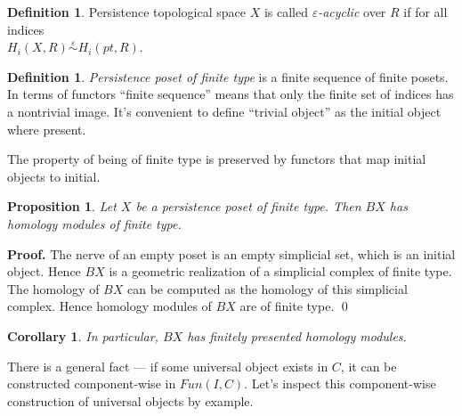 \documentclass[english,12pt]{article}
\newcounter{stmcounter}[section]
\numberwithin{equation}{section}
\newtheorem{proposition}[stmcounter]{Proposition}
\newtheorem{corollary}[stmcounter]{Corollary}
\theoremstyle{definition}
\newtheorem{definition}[stmcounter]{Definition}
\theoremstyle{remark}
\newenvironment{pf}{\noindent\textbf{Proof.}}{\qed}
\newcommand{\define}[1]{{\textit{#1}}}
\begin{document}
\begin{definition}
  Persistence topological space $X$ is called \define{$\varepsilon$-acyclic} over $R$ if for all indices\\ $H_i(X,R) \stackrel{\varepsilon}{\sim} H_i(pt,R)$.
\end{definition}

\begin{definition}
  \define{Persistence poset of finite type} is a finite sequence of finite posets.\\

  In terms of functors ``finite sequence'' means that only the finite set of indices has a nontrivial image. It's convenient to define ``trivial object'' as the initial object where present.
\end{definition}

The property of being of finite type is preserved by functors that map initial objects to initial.\\

\begin{proposition}
  Let $X$ be a persistence poset of finite type. Then $BX$ has homology modules of finite type.
\end{proposition}

\begin{pf}
  The nerve of an empty poset is an empty simplicial set, which is an initial object. Hence $BX$ is a geometric realization of a simplicial complex of finite type. The homology of $BX$ can be computed as the homology of this simplicial complex. Hence homology modules of $BX$ are of finite type.
\end{pf}\\

\begin{corollary}
  In particular, $BX$ has finitely presented homology modules.
\end{corollary}

There is a general fact --- if some universal object exists in $C$, it can be constructed component-wise in $Fun(I,C)$. Let's inspect this component-wise construction of universal objects by example.\\
\end{document}

